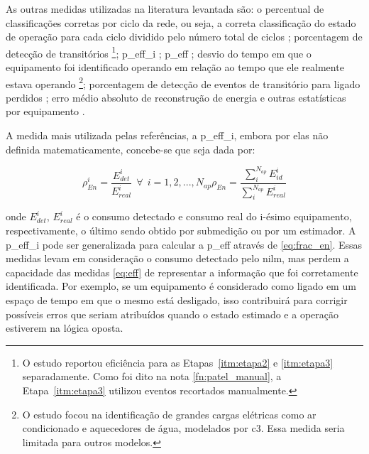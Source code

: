 As outras medidas utilizadas na literatura levantada são: o
percentual de classificações corretas por ciclo da rede, ou seja, a
correta classificação do estado de operação para cada ciclo dividido
pelo número total de ciclos
\cite{nilm_srinivasan_nn_2006_27,nilm_suzuki_2011_35}; porcentagem de
detecção de transitórios \cite{nilm_patel_2007_29}\footnote{O estudo
reportou eficiência para as Etapas~\ref{itm:etapa2} e \ref{itm:etapa3}
separadamente. Como foi dito na nota \ref{fn:patel_manual}, a
Etapa~\ref{itm:etapa3} utilizou eventos recortados manualmente.};
\gls{p_eff_i}
\cite{nilm_hart_1992_8,nilm_cole_data_extraction_1998_14,
nilm_cole_extra_info_surge_1998_15,nilm_farinaccio_16ssamp_1999_17,
nilm_marceau_16ssamp_improved_1999_18}; \gls{p_eff}
\cite{2010_nilm_melhorando_pph_usa_37}; desvio
do tempo em que o equipamento foi identificado operando em relação ao
tempo que ele realmente estava operando
\cite{nilm_farinaccio_16ssamp_1999_17}\footnote{O estudo focou na
identificação de grandes cargas elétricas como ar condicionado e
aquecedores de água, modelados por \gls{c3}\label{fn:valc3}. Essa
medida seria limitada para outros modelos.}; porcentagem de detecção
de eventos de transitório para ligado perdidos
\cite{nilm_farinaccio_16ssamp_1999_17}; erro médio
absoluto de reconstrução de energia e outras estatísticas por equipamento
\cite{nilm_powers_15minsamp_1991_16}.

A medida mais utilizada pelas referências, a \gls{p_eff_i}, embora
por elas não definida matematicamente, concebe-se que seja dada por:

\begin{subequations}
\begin{equation}\label{eq:frac_en_app}
\rho_{En}^i = \frac{E_{det}^i}{E_{real}^i} ~~ \forall ~~
i = 1,2,...,N_{ap}
\end{equation}
\begin{equation}\label{eq:frac_en}
\rho_{En} = \frac{\sum_{i}^{N_{ap}}E_{id}^i}{\sum_{i}^{N_{ap}}E_{real}^i}
\end{equation}
\end{subequations}

\noindent onde $E_{det}^i$, $E_{real}^i$ é o consumo detectado e
consumo real do i-ésimo equipamento, respectivamente, o último sendo
obtido por submedição ou por um estimador. A \gls{p_eff_i}
pode ser generalizada para calcular a \gls{p_eff} através de
\ref{eq:frac_en}.  Essas medidas levam em consideração o consumo
detectado pelo \gls{nilm}, mas perdem a capacidade das medidas
\ref{eq:eff} de representar a informação que foi corretamente
identificada. Por exemplo, se um equipamento é considerado como ligado
em um espaço de tempo em que o mesmo está desligado, isso
contribuirá para corrigir possíveis erros que seriam atribuídos quando
o estado estimado e a operação estiverem na lógica oposta.

